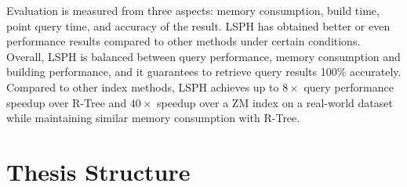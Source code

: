 Evaluation is measured from three aspects: memory consumption, build time, point query time, and accuracy of the result. LSPH has obtained better or even performance results compared to other methods under certain conditions. Overall, LSPH is balanced between query performance, memory consumption and building performance, and it guarantees to retrieve query results 100\% accurately. Compared to other index methods, LSPH achieves up to $8\times$ query performance speedup over R-Tree and $40\times$ speedup over a ZM index on a real-world dataset while maintaining similar memory consumption with R-Tree.  




\section{Thesis Structure}
